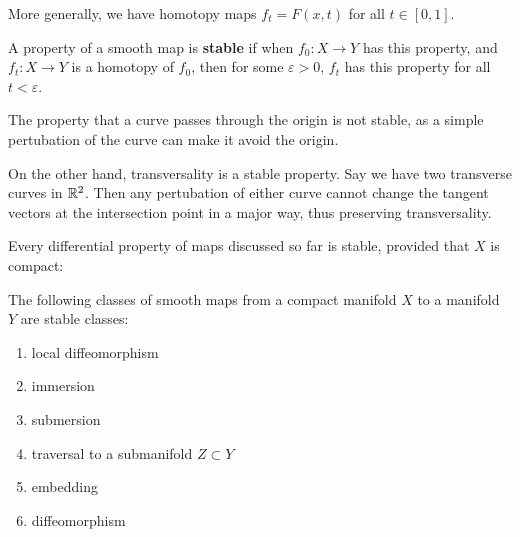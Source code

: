 More generally, we have homotopy maps $f_t = F(x,t)$ for all $t \in [0,1]$. 

\begin{definition}
    A property of a smooth map is \textbf{stable} if when $f_0: X \to Y$ has this property, and $f_t: X \to Y$ is a homotopy of $f_0$, then for some $\varepsilon > 0$, $f_t$ has this property for all $t < \varepsilon$. 
\end{definition}

\begin{example}
    The property that a curve passes through the origin is not stable, as a simple pertubation of the curve can make it avoid the origin. 
    
    On the other hand, transversality is a stable property. Say we have two transverse curves in $\mathbb{R}^2$. Then any pertubation of either curve cannot change the tangent vectors at the intersection point in a major way, thus preserving transversality. 
\end{example}

Every differential property of maps discussed so far is stable, provided that $X$ is compact:

\begin{theorem}
    The following classes of smooth maps from a compact manifold $X$ to a manifold $Y$ are stable classes:

    \begin{enumerate}[label=(\roman*)]
        \item local diffeomorphism 
        \item immersion
        \item submersion
        \item traversal to a submanifold $Z \subset Y$
        \item embedding 
        \item diffeomorphism 
    \end{enumerate}
\end{theorem}

